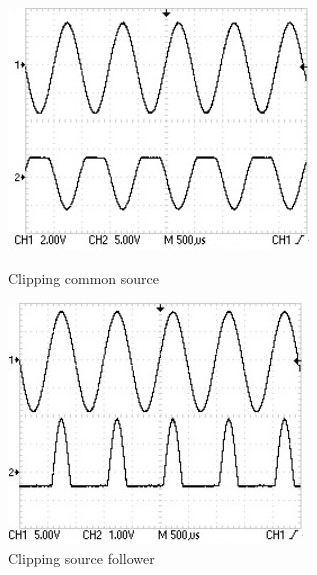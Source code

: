 \documentclass[10pt,a4paper]{article}
\begin{document}
\begin{figure}[h!]
	\centering
	\begin{minipage}{0.49\textwidth}
		\centering
		\includegraphics[width=\textwidth]{../oscilloscopio/clipalto.jpg}
		\caption{Clipping common source}
			\label{fig:clippingalto}
	\end{minipage}
	\begin{minipage}{0.49\textwidth}
		\centering
		\includegraphics[width=\textwidth]{../oscilloscopio/clipping basso.jpg}
		\caption{Clipping source follower}	
			\label{fig:clippingbasso}	
	\end{minipage}
\end{figure}
\end{document}
